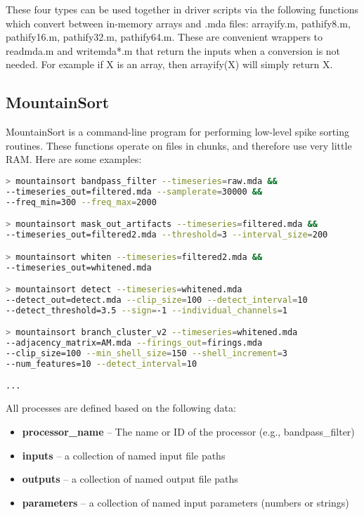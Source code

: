 \documentclass{article}
\begin{document}
These four types can be used together in driver scripts via the following functions which convert between in-memory arrays and .mda files: arrayify.m, pathify8.m, pathify16.m, pathify32.m, pathify64.m. These are convenient wrappers to readmda.m and writemda*.m that return the inputs when a conversion is not needed. For example if X is an array, then arrayify(X) will simply return X.

\subsection{MountainSort}

MountainSort is a command-line program for performing low-level spike sorting routines. These functions operate on files in chunks, and therefore use very little RAM. Here are some examples:
\begin{lstlisting}[language=bash]
> mountainsort bandpass_filter --timeseries=raw.mda &&
--timeseries_out=filtered.mda --samplerate=30000 &&
--freq_min=300 --freq_max=2000

> mountainsort mask_out_artifacts --timeseries=filtered.mda &&
--timeseries_out=filtered2.mda --threshold=3 --interval_size=200

> mountainsort whiten --timeseries=filtered2.mda &&
--timeseries_out=whitened.mda

> mountainsort detect --timeseries=whitened.mda
--detect_out=detect.mda --clip_size=100 --detect_interval=10
--detect_threshold=3.5 --sign=-1 --individual_channels=1

> mountainsort branch_cluster_v2 --timeseries=whitened.mda
--adjacency_matrix=AM.mda --firings_out=firings.mda
--clip_size=100 --min_shell_size=150 --shell_increment=3
--num_features=10 --detect_interval=10

...
\end{lstlisting}

All processes are defined based on the following data:
\begin{itemize}
\item{\textbf{processor\_name} -- The name or ID of the processor (e.g., bandpass\_filter)}
\item{\textbf{inputs} -- a collection of named input file paths}
\item{\textbf{outputs} -- a collection of named output file paths}
\item{\textbf{parameters} -- a collection of named input parameters (numbers or strings)}
\end{itemize}
\end{document}
